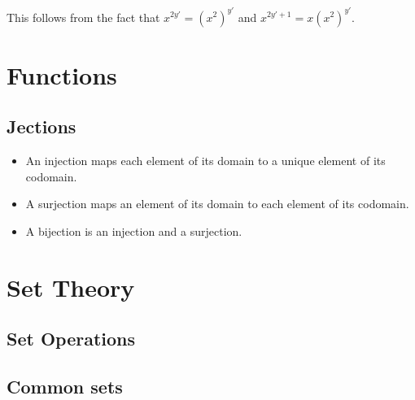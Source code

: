 \documentclass[fleqn,a4paper,11pt]{article}
\begin{document}
    This follows from the fact that
    \(x^{2y'} = (x^2)^{y'}\) and \(x^{2y' + 1} = x(x^2)^{y'}\).

    \section{Functions}


    \subsection{Jections}


    \begin{itemize}
    \item An injection maps each element of its domain to a unique element of
          its codomain.
    \item A surjection maps an element of its domain to each element of its
          codomain.
    \item A bijection is an injection and a surjection.
    \end{itemize}

    \section{Set Theory}

    \subsection{Set Operations}

    \subsection{Common sets}

\end{document}
